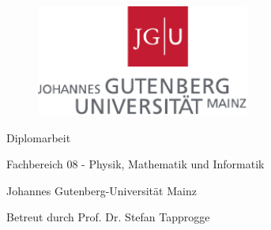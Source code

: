 


\makeatletter
\begin{titlepage}	
  
  \begin{figure}[h]
    \centering
    \includegraphics[angle=0,width=7cm]{img/JGU}
  \end{figure}

  \vspace*{2cm}

  \begin{center}
    \LARGE{\bf\@title}
  \end{center}

  \vfill

  \begin{center}
      \Large{ \@author }
  \end{center} 

  \vfill

  \begin{center}
    \Huge{Diplomarbeit}
  \end{center}

  \vfill

  \begin{center}
    \large{Fachbereich 08 - Physik, Mathematik und Informatik}

    \large{Johannes Gutenberg-Universität Mainz}

    \large{ \@date }
  \end{center}
  
  \vfill

    
  \large{Betreut durch Prof. Dr. Stefan Tapprogge}

\end{titlepage}
\makeatother
